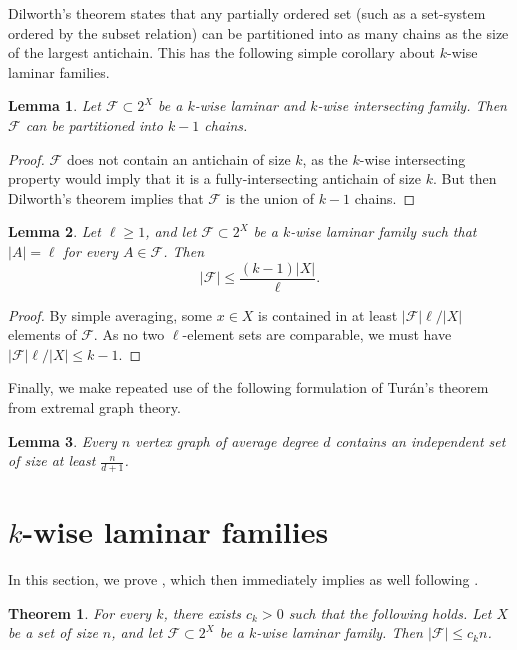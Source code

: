 \documentclass[11pt]{article}
\newtheorem{theorem}{Theorem}[section]
\newtheorem{lemma}[lemma]{Lemma}
\theoremstyle{definition}
\newcommand{\cF}{\mathcal{F}}
\begin{document}
Dilworth's theorem \cite{Dilworth} states that  any partially ordered set (such as a set-system ordered by the subset relation) can be partitioned into as many chains as the size of the largest antichain. This has the following simple corollary about $k$-wise laminar families. 

\begin{lemma}\label{lemma:dilworth}
Let $\cF\subset 2^X$ be a $k$-wise laminar and $k$-wise intersecting family. Then $\mathcal{F}$ can be partitioned into $k-1$ chains.
\end{lemma}

\begin{proof}
 $\cF$ does not contain an antichain of size $k$, as the $k$-wise intersecting property would imply that it is a fully-intersecting antichain of size $k$. But then Dilworth's theorem \cite{Dilworth} implies that $\cF$ is the union of $k-1$ chains.
\end{proof}

\begin{lemma}\label{lemma:uniform}
Let $\ell\geq 1$, and let $\cF\subset 2^X$ be a $k$-wise laminar family such that $|A|=\ell$ for every $A\in \cF$. Then 
$$|\cF|\leq \frac{(k-1)|X|}{\ell}.$$ 
\end{lemma}

\begin{proof}
By simple averaging, some $x\in X$ is contained in at least $|\cF|\ell/|X|$ elements of $\cF$. As no two $\ell$-element sets are comparable, we must have $|\cF|\ell/|X|\leq k-1$.
\end{proof}

Finally, we make repeated use of the following formulation of Tur\'an's theorem \cite{turan} from extremal graph theory.

\begin{lemma}\label{lemma:turan}
Every $n$ vertex graph of average degree $d$ contains an independent set of size at least $\frac{n}{d+1}$.
\end{lemma}

\section{\texorpdfstring{$k$}{k}-wise laminar families}

In this section, we prove , which then immediately implies  as well following .

\begin{theorem}\label{thm:main}
    For every $k$, there exists $c_k>0$ such that the following holds. Let $X$ be a set of size $n$, and let $\cF\subset 2^X$ be a $k$-wise laminar family. Then $|\cF|\leq c_kn$.
\end{theorem}
\end{document}
